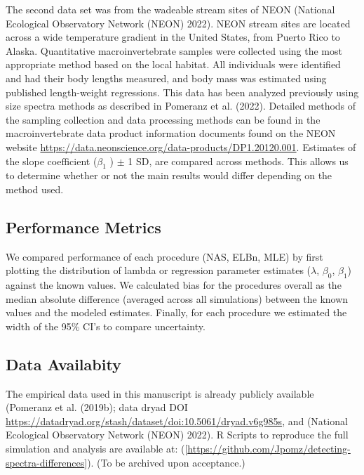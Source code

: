 \documentclass[
]{article}
\begin{document}
The second data set was from the wadeable stream sites of NEON (National
Ecological Observatory Network (NEON) 2022). NEON stream sites are
located across a wide temperature gradient in the United States, from
Puerto Rico to Alaska. Quantitative macroinvertebrate samples were
collected using the most appropriate method based on the local habitat.
All individuals were identified and had their body lengths measured, and
body mass was estimated using published length-weight regressions. This
data has been analyzed previously using size spectra methods as
described in Pomeranz et al. (2022). Detailed methods of the sampling
collection and data processing methods can be found in the
macroinvertebrate data product information documents found on the NEON
website \url{https://data.neonscience.org/data-products/DP1.20120.001}.
Estimates of the slope coefficient (\(\beta_1\) ) \(\pm\) 1 SD, are
compared across methods. This allows us to determine whether or not the
main results would differ depending on the method used.

\hypertarget{performance-metrics}{%
\subsection{Performance Metrics}\label{performance-metrics}}

We compared performance of each procedure (NAS, ELBn, MLE) by first
plotting the distribution of lambda or regression parameter estimates
(\(\lambda\), \(\beta_{0}\), \(\beta_{1}\)) against the known values. We
calculated bias for the procedures overall as the median absolute
difference (averaged across all simulations) between the known values
and the modeled estimates. Finally, for each procedure we estimated the
width of the 95\% CI's to compare uncertainty.

\hypertarget{data-availabity}{%
\subsection{Data Availabity}\label{data-availabity}}

The empirical data used in this manuscript is already publicly available
(Pomeranz et al. (2019b); data dryad DOI
\url{https://datadryad.org/stash/dataset/doi:10.5061/dryad.v6g985s}, and
(National Ecological Observatory Network (NEON) 2022). R Scripts to
reproduce the full simulation and analysis are available at:
({[}\url{https://github.com/Jpomz/detecting-spectra-differences}{]}).
(To be archived upon acceptance.)
\end{document}
